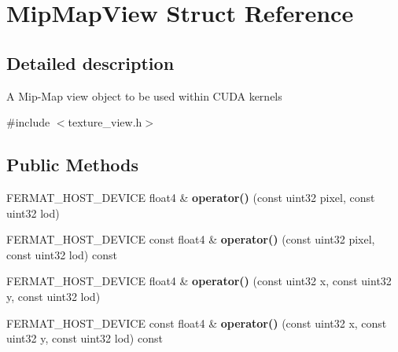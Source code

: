 \hypertarget{struct_mip_map_view}{}\section{Mip\+Map\+View Struct Reference}
\label{struct_mip_map_view}


\subsection{Detailed description}
A Mip-\/\+Map view object to be used within C\+U\+DA kernels 

{\ttfamily \#include $<$texture\+\_\+view.\+h$>$}

\subsection*{Public Methods}
\begin{DoxyCompactItemize}
\item 
\mbox{\label{struct_mip_map_view_a0493d8a45e5c4521111e39aba9d429a0}} 
F\+E\+R\+M\+A\+T\+\_\+\+H\+O\+S\+T\+\_\+\+D\+E\+V\+I\+CE float4 \& {\bfseries operator()} (const uint32 pixel, const uint32 lod)
\item 
\mbox{\label{struct_mip_map_view_aee91c8062875a7e082b7b9fc69f51404}} 
F\+E\+R\+M\+A\+T\+\_\+\+H\+O\+S\+T\+\_\+\+D\+E\+V\+I\+CE const float4 \& {\bfseries operator()} (const uint32 pixel, const uint32 lod) const
\item 
\mbox{\label{struct_mip_map_view_acfc62302d92fe81ddbc870397789c0ed}} 
F\+E\+R\+M\+A\+T\+\_\+\+H\+O\+S\+T\+\_\+\+D\+E\+V\+I\+CE float4 \& {\bfseries operator()} (const uint32 x, const uint32 y, const uint32 lod)
\item 
\mbox{\label{struct_mip_map_view_aba589d8b204e2a38fc7766f809760a57}} 
F\+E\+R\+M\+A\+T\+\_\+\+H\+O\+S\+T\+\_\+\+D\+E\+V\+I\+CE const float4 \& {\bfseries operator()} (const uint32 x, const uint32 y, const uint32 lod) const
\end{DoxyCompactItemize}
